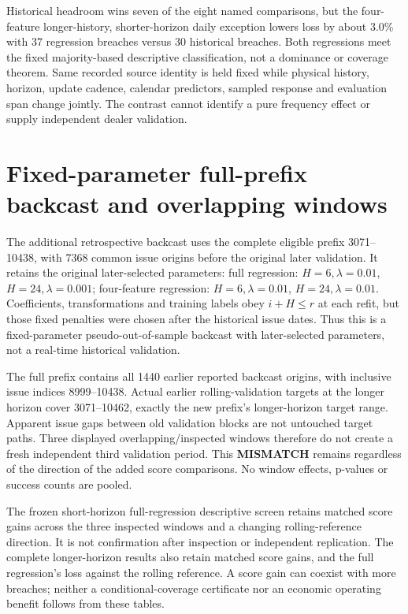 \documentclass[11pt,a4paper]{article}
\begin{document}


Historical headroom wins seven of the eight named comparisons, but the
four-feature longer-history, shorter-horizon daily exception lowers loss by
about 3.0\% with 37 regression breaches versus 30 historical breaches.
Both regressions meet the fixed majority-based descriptive classification,
not a dominance or coverage theorem. Same recorded source identity is held
fixed while physical history, horizon, update cadence, calendar predictors,
sampled response and evaluation span change jointly. The contrast cannot
identify a pure frequency effect or supply independent dealer validation.


\section{Fixed-parameter full-prefix backcast and overlapping windows}\label{sup:v8-backcast}

The additional retrospective backcast uses the complete eligible prefix
3071--10438, with 7368 common issue origins before the original later
validation. It retains the original later-selected parameters: full regression: \(H=6,\lambda=0.01\), \(H=24,\lambda=0.001\); four-feature regression: \(H=6,\lambda=0.01\), \(H=24,\lambda=0.01\).
Coefficients, transformations and training labels obey \(i+H\le r\) at each
refit, but those fixed penalties were chosen after the historical issue dates.
Thus this is a fixed-parameter pseudo-out-of-sample backcast with later-selected
parameters, not a real-time historical validation.

The full prefix contains all 1440 earlier reported backcast origins,
with inclusive issue indices 8999--10438.
Actual earlier rolling-validation targets at the longer horizon cover 3071--10462,
exactly the new prefix's longer-horizon target range. Apparent issue gaps between old validation blocks
are not untouched target paths. Three displayed overlapping/inspected windows
therefore do not create a fresh independent third validation period. This
\textbf{MISMATCH} remains regardless of the direction of the added score
comparisons. No window effects, p-values or success counts are pooled.




The frozen short-horizon full-regression descriptive screen retains matched
score gains across the three inspected windows and a changing rolling-reference
direction. It is not confirmation after inspection or independent replication.
The complete longer-horizon results also retain matched score gains, and the
full regression's loss against the rolling reference. A score gain can coexist
with more breaches; neither a conditional-coverage certificate nor an economic
operating benefit follows from these tables.
\end{document}
